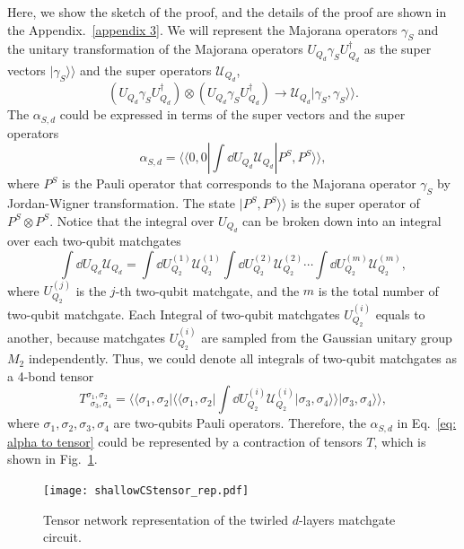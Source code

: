\documentclass{article}
\newcommand{\supket}[1]{|#1 \rangle\rangle}
\newcommand{\supbra}[1]{\langle\langle #1 |}
\begin{document}
Here, we show the sketch of the proof, and the details of the proof are shown in the Appendix.~\ref{appendix 3}. We will represent the Majorana operators $\gamma_S$ and the unitary transformation of the Majorana operators $U_{Q_d} \gamma_S U_{Q_d}^\dagger$ as the super vectors $\supket{\gamma_S}$ and the super operators $\mathcal{U}_{Q_d}$,
\begin{equation}
   \left(U_{Q_d} \gamma_S U_{Q_d}^\dagger \right) \otimes \left(U_{Q_d} \gamma_S U_{Q_d}^\dagger \right) \to \mathcal{U}_{Q_d} \supket{\gamma_S, \gamma_S}.
\end{equation}
The $\alpha_{S,d}$ could be expressed in terms of the super vectors and the super operators
\begin{equation}
\label{eq: alpha to tensor}
    \alpha_{S,d} 
    = \supbra{0,0}  \int \dd U_{Q_d} \mathcal{U}_{Q_d} \supket{P^S,P^S},
\end{equation}
where $P^S$ is the Pauli operator that corresponds to the Majorana operator $\gamma_S$ by Jordan-Wigner transformation. The state $\supket{P^S,P^S}$ is the 
super operator of $P^S \otimes P^S$.
Notice that the integral over $U_{Q_d}$ can be broken down into an integral over each two-qubit matchgates
\begin{equation}
    \int \dd U_{Q_d} \mathcal{U}_{Q_d} = \int \dd U_{Q_2}^{(1)} \mathcal{U}_{Q_2}^{(1)} \int \dd U_{Q_2}^{(2)} \mathcal{U}_{Q_2}^{(2)} \cdots\int \dd U_{Q_2}^{(m)} \mathcal{U}_{Q_2}^{(m)},
\end{equation}
where $U_{Q_2}^{(j)}$ is the $j$-th two-qubit matchgate, and the $m$ is the total number of two-qubit matchgate. Each Integral of two-qubit matchgates $U_{Q_2}^{(i)}$ equals to another, because matchgates $U_{Q_2}^{(i)}$ are sampled from the Gaussian unitary group $M_2$ independently. Thus, we could denote all integrals of two-qubit matchgates as a 4-bond tensor
\begin{equation}
    T^{\sigma_1, \sigma_2}_{~~\sigma_3, \sigma_4} = \supbra{\sigma_1, \sigma_2}\supbra{\sigma_1, \sigma_2}\int \dd U_{Q_2}^{(i)} \mathcal{U}_{Q_2}^{(i)} \supket{\sigma_3, \sigma_4}\supket{\sigma_3, \sigma_4},
\end{equation}
where $\sigma_1, \sigma_2, \sigma_3, \sigma_4$ are two-qubits Pauli operators. 
Therefore,  the $\alpha_{S,d}$ in Eq.~\eqref{eq: alpha to tensor} could be represented by a contraction of tensors $T$, which is shown in Fig.~\ref{fig:TNcoefRep}.

\begin{figure}
    \centering
    \texttt{[image: shallowCStensor\_rep.pdf]}
    \caption{Tensor network representation of the twirled $d$-layers matchgate circuit.}
    \label{fig:TNcoefRep}
\end{figure}
    
\end{document}
